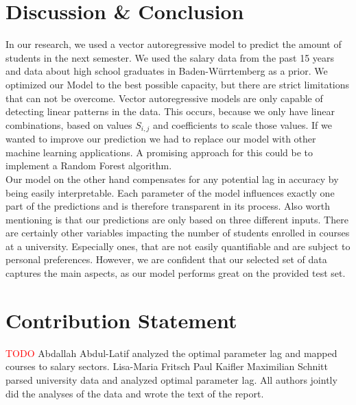 \documentclass{article}
\theoremstyle{plain}
\theoremstyle{definition}
\theoremstyle{remark}
\begin{document}
\section{Discussion \& Conclusion}\label{sec:conclusion}
In our research, we used a vector autoregressive model to predict the amount of students in the next semester. 
We used the salary data from the past 15 years and data about high school graduates in Baden-Würrtemberg as a prior. We optimized our Model to the best possible capacity,
but there are strict limitations that can not be overcome. Vector autoregressive models are only capable of detecting linear patterns in the data.
This occurs, because we only have linear combinations, based on values $S_{i,j}$ and coefficients to scale those values. If we wanted to improve
our prediction we had to replace our model with other machine learning applications.
A promising approach for this could be to implement a Random Forest algorithm.\\
Our model on the other hand compensates for any potential lag in accuracy by being easily interpretable. Each parameter of the model influences exactly
one part of the predictions and is therefore transparent in its process.
Also worth mentioning is that our predictions are only based on three different inputs. There are certainly other 
variables impacting the number of students enrolled in courses at a university. Especially ones, that are not easily quantifiable and are subject to
personal preferences. However, we are confident that our selected set of data captures the main aspects, as our model performs great on the provided test set.


\section*{Contribution Statement}
\textcolor{red}{TODO}
Abdallah Abdul-Latif analyzed the optimal parameter lag and mapped courses to salary sectors.
Lisa-Maria Fritsch
Paul Kaifler 
Maximilian Schnitt parsed university data and analyzed optimal parameter lag.
All authors jointly did the analyses of the data and wrote the text of the report.


\end{document}
